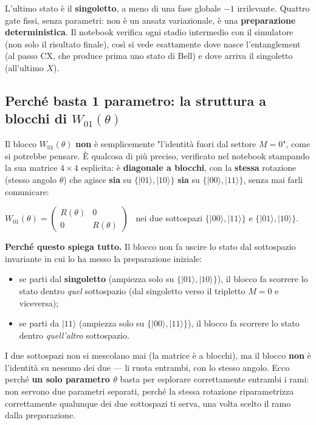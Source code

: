 \documentclass[11pt,a4paper]{article}
\begin{document}
L'ultimo stato è il \textbf{singoletto}, a meno di una fase globale $-1$
irrilevante. Quattro gate fissi, senza parametri: non è un ansatz
variazionale, è una \textbf{preparazione deterministica}. Il notebook
verifica ogni stadio intermedio con il simulatore (non solo il risultato
finale), così si vede esattamente dove nasce l'entanglement (al passo
CX, che produce prima uno stato di Bell) e dove arriva il singoletto
(all'ultimo $X$).

\subsection*{Perché basta 1 parametro: la struttura a blocchi di $W_{01}(\theta)$}

Il blocco $W_{01}(\theta)$ \textbf{non} è semplicemente "l'identità
fuori dal settore $M=0$", come si potrebbe pensare. È qualcosa di più
preciso, verificato nel notebook stampando la sua matrice $4\times4$
esplicita: è \textbf{diagonale a blocchi}, con la \textbf{stessa}
rotazione (stesso angolo $\theta$) che agisce \textbf{sia} su
$\{|01\rangle,|10\rangle\}$ \textbf{sia} su $\{|00\rangle,|11\rangle\}$,
senza mai farli comunicare:

\begin{keyeq}
\centering
$W_{01}(\theta) = \begin{pmatrix} R(\theta) & 0 \\ 0 & R(\theta)\end{pmatrix}$
\ nei due sottospazi $\{|00\rangle,|11\rangle\}$ e $\{|01\rangle,|10\rangle\}$.
\end{keyeq}

\textbf{Perché questo spiega tutto.} Il blocco non fa uscire lo stato
dal sottospazio invariante in cui lo ha messo la preparazione iniziale:
\begin{itemize}[leftmargin=1.3em,itemsep=0.1em]
\item se parti dal \textbf{singoletto} (ampiezza solo su
$\{|01\rangle,|10\rangle\}$), il blocco fa scorrere lo stato dentro
\emph{quel} sottospazio (dal singoletto verso il tripletto $M=0$ e
viceversa);
\item se parti da $|11\rangle$ (ampiezza solo su
$\{|00\rangle,|11\rangle\}$), il blocco fa scorrere lo stato dentro
\emph{quell'altro} sottospazio.
\end{itemize}

I due sottospazi non si mescolano mai (la matrice è a blocchi), ma il
blocco \textbf{non} è l'identità su nessuno dei due --- li ruota
entrambi, con lo stesso angolo. Ecco perché \textbf{un solo parametro
$\theta$} basta per esplorare correttamente entrambi i rami: non
servono due parametri separati, perché la stessa rotazione
riparametrizza correttamente qualunque dei due sottospazi ti serva, una
volta scelto il ramo dalla preparazione.
\end{document}
